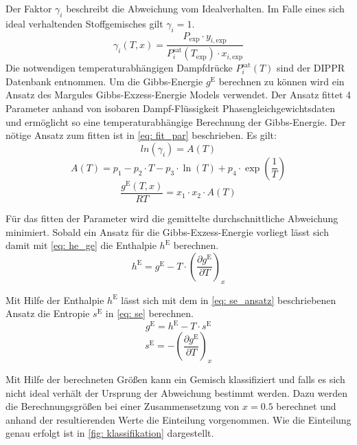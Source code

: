 \documentclass[../thesis.tex]{subfiles}
\begin{document}
Der Faktor $\gamma_i$ beschreibt die Abweichung vom Idealverhalten. Im Falle eines sich ideal verhaltenden Stoffgemisches gilt $\gamma_i = 1$.
\begin{equation}
	\gamma_i \left(T,x \right) = \dfrac{P_{\mathrm{exp}} \cdot y_{i,\mathrm{exp}}}{P_{i}^{\mathrm{sat}}(T_{\mathrm{exp}}) \cdot x_{i,\mathrm{exp}}}
\end{equation}
Die notwendigen temperaturabhängigen Dampfdrücke $P_{i}^{\mathrm{sat}}(T)$ sind der DIPPR Datenbank entnommen.
Um die Gibbs-Energie $g^{\mathrm{E}}$ berechnen zu können wird ein Ansatz des Margules Gibbs-Exzess-Energie Models verwendet. Der Ansatz fittet 4 Parameter anhand von isobaren Dampf-Flüssigkeit Phasengleichgewichtsdaten und ermöglicht so eine temperaturabhängige Berechnung der Gibbs-Energie. Der nötige Ansatz zum fitten ist in \autoref{eq: fit_par} beschrieben. Es gilt:
\begin{equation}
	\label{eq: fit_par}
	ln(\gamma_i) = A(T)
\end{equation}
\begin{equation}
	A(T) = p_1 - p_2 \cdot T-p_3 \cdot \ln(T)+p_4 \cdot \exp{ \left( \dfrac{1}{T} \right)}
\end{equation}
\begin{equation}
	\dfrac{g^{\mathrm{E}}(T,x)}{RT} = x_1 \cdot x_2 \cdot A(T) 
\end{equation}

Für das fitten der Parameter wird die gemittelte durchschnittliche Abweichung minimiert. Sobald ein Ansatz für die Gibbs-Exzess-Energie vorliegt lässt sich damit mit \autoref{eq: he_ge} die Enthalpie $h^{\mathrm{E}}$ berechnen.
\begin{equation}
	\label{eq: he_ge}
	h^{\mathrm{E}} = g^{\mathrm{E}} - T \cdot \left( \dfrac{\partial g^{\mathrm{E}}}{\partial T} \right)_x
\end{equation}

Mit Hilfe der Enthalpie $h^{\mathrm{E}}$ lässt sich mit dem in \autoref{eq: se_ansatz} beschriebenen Ansatz die Entropie $s^{\mathrm{E}}$ in \autoref{eq: se} berechnen.
\begin{equation}
	\label{eq: se_ansatz}
	g^{\mathrm{E}} = h^{\mathrm{E}} - T \cdot s^{\mathrm{E}}
\end{equation}
\begin{equation}
	\label{eq: se}
	s^{\mathrm{E}} = - \left( \dfrac{\partial g^{\mathrm{E}}}{\partial T} \right)_x
\end{equation}

Mit Hilfe der berechneten Größen kann ein Gemisch klassifiziert und falls es sich nicht ideal verhält der Ursprung der Abweichung bestimmt werden. Dazu werden die Berechnungsgrößen bei einer Zusammensetzung von $x=\text{0.5}$ berechnet und anhand der resultierenden Werte die Einteilung vorgenommen. Wie die Einteilung genau erfolgt ist in \autoref{fig: klassifikation} dargestellt.
\end{document}
